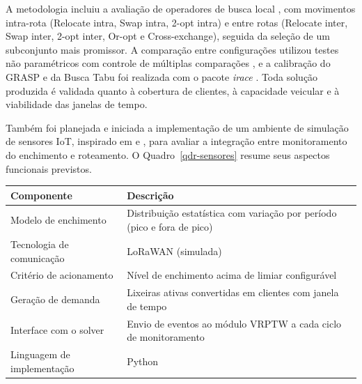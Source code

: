 \documentclass[12pt, a4paper]{article}
\begin{document}
A metodologia incluiu a avaliação de operadores de busca local \citep{toth2002vehicle, potvin1995exchange}, com movimentos intra-rota (Relocate intra, Swap intra, 2-opt intra) e entre rotas (Relocate inter, Swap inter, 2-opt inter, Or-opt e Cross-exchange), seguida da seleção de um subconjunto mais promissor. A comparação entre configurações utilizou testes não paramétricos com controle de múltiplas comparações \citep{demsar2006statistical}, e a calibração do GRASP e da Busca Tabu foi realizada com o pacote \textit{irace} \citep{lopez2016irace}. Toda solução produzida é validada quanto à cobertura de clientes, à capacidade veicular e à viabilidade das janelas de tempo.

Também foi planejada e iniciada a implementação de um ambiente de simulação de sensores IoT, inspirado em \citet{lozano2018smart} e \citet{de2021plataforma}, para avaliar a integração entre monitoramento do enchimento e roteamento. O Quadro~\ref{qdr-sensores} resume seus aspectos funcionais previstos.

\begin{quadro}[H]
    \centering
    \caption{Aspectos funcionais do ambiente de simulação de sensores IoT}
    \label{qdr-sensores}
    \fontsize{10}{12}\selectfont
    \begin{tabular}{|p{64mm}|p{82mm}|}
        \hline
        \rowcolor{gray!25}
        \centering\textbf{Componente} & \centering\textbf{Descrição} \tabularnewline
        \hline
        Modelo de enchimento & Distribuição estatística com variação por período (pico e fora de pico) \\
        \hline
        Tecnologia de comunicação & LoRaWAN (simulada) \\
        \hline
        Critério de acionamento & Nível de enchimento acima de limiar configurável \\
        \hline
        Geração de demanda & Lixeiras ativas convertidas em clientes com janela de tempo \\
        \hline
        Interface com o solver & Envio de eventos ao módulo VRPTW a cada ciclo de monitoramento \\
        \hline
        Linguagem de implementação & Python \\
        \hline
    \end{tabular}
    \vspace{5pt}
    \caption*{Fonte: Produção da própria autora.}
    \caption*{\textit{Descrição do Quadro~\ref{qdr-sensores}:} quadro com seis linhas descrevendo os componentes funcionais do ambiente de simulação, desde o modelo de enchimento com variação temporal até a interface de integração com o solver VRPTW.}
\end{quadro}
\end{document}
